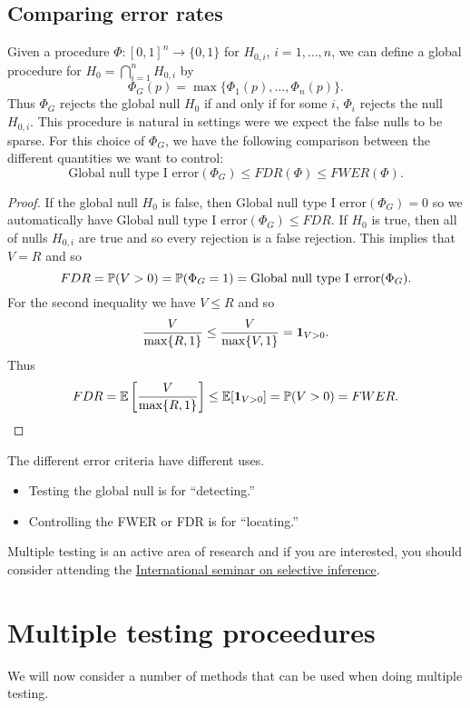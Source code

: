 \subsection{Comparing error rates}
Given a procedure $\Phi:[0,1]^n \to \{0,1\}$ for $H_{0,i}$, $i=1,\ldots,n$, we can define a global procedure for $H_0 = \bigcap_{i=1}^n H_{0,i}$ by
\[\Phi_G(p)=\max\{\Phi_1(p),\ldots, \Phi_n(p)\}. \]
Thus $\Phi_G$ rejects the global null $H_0$ if and only if for some $i$, $\Phi_i$ rejects the null $H_{0,i}$. This procedure is natural in settings were we expect the false nulls to be sparse. For this choice of $\Phi_G$, we have the following comparison between the different quantities we want to control:
\[\text{Global null type I error}(\Phi_G) \le FDR(\Phi) \le FWER(\Phi). \]
\begin{proof}
    If the global null $H_0$ is false, then $\text{Global null type I error}(\Phi_G)=0$ so we automatically have $\text{Global null type I error}(\Phi_G) \le FDR$. If $H_0$ is true, then all of nulls $H_{0,i}$ are true and so every rejection is a false rejection. This implies that $V=R$ and so 
    \[FDR = {\mathbb{P}}(V>0) = {\mathbb{P}}(\Phi_G=1) = \text{Global null type I error}(\Phi_G). \]
    For the second inequality we have $V \le R$ and so 
    \[\frac{V}{\max\{R,1\}}\le \frac{V}{\max\{V,1\}} = {{\bf 1}}_{V > 0}. \]
    Thus 
    \[FDR = {\mathbb{E}}\left[\frac{V}{\max\{R,1\}}\right] \le {\mathbb{E}}[{{\bf 1}}_{V > 0}]={\mathbb{P}}(V>0)=FWER.\qedhere\]
\end{proof}
The different error criteria have different uses.
\begin{itemize}
    \item Testing the global null is for ``detecting.''
    \item Controlling the FWER or FDR is for ``locating.''
\end{itemize}
Multiple testing is an active area of research and if you are interested, you should consider attending the \href{https://www.selectiveinferenceseminar.com/home}{International seminar on selective inference}.
\section{Multiple testing proceedures}
We will now consider a number of methods that can be used when doing multiple testing.
